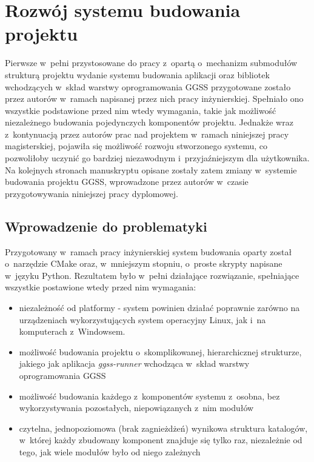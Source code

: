 \clearpage
\section{Rozwój systemu budowania projektu}
\label{ch:building_project}

Pierwsze w~pełni przystosowane do pracy z~opartą o~mechanizm submodułów strukturą projektu wydanie systemu budowania aplikacji oraz bibliotek wchodzących w~skład warstwy oprogramowania GGSS przygotowane zostało przez autorów w~ramach napisanej przez nich pracy inżynierskiej. Spełniało ono wszystkie podstawione przed nim wtedy wymagania, takie jak możliwość niezależnego budowania pojedynczych komponentów projektu. Jednakże wraz z~kontynuacją przez autorów prac nad projektem w~ramach niniejszej pracy magisterskiej, pojawiła się możliwość rozwoju stworzonego systemu, co pozwoliłoby uczynić go bardziej niezawodnym i~przyjaźniejszym dla użytkownika. Na kolejnych stronach manuskryptu opisane zostały zatem zmiany w~systemie budowania projektu GGSS, wprowadzone przez autorów w~czasie przygotowywania niniejszej pracy dyplomowej.

\subsection{Wprowadzenie do problematyki}
Przygotowany w~ramach pracy inżynierskiej system budowania oparty został o~narzędzie CMake oraz, w~mniejszym stopniu, o~proste skrypty napisane w~języku Python. Rezultatem było w~pełni działające rozwiązanie, spełniające wszystkie postawione wtedy przed nim wymagania:
\begin{itemize}
    \item niezależność od platformy - system powinien działać poprawnie zarówno na urządzeniach wykorzystujących system operacyjny Linux, jak i~na komputerach z~Windowsem.
    \item możliwość budowania projektu o~skomplikowanej, hierarchicznej strukturze, jakiego jak aplikacja \emph{ggss-runner} wchodząca w~skład warstwy oprogramowania GGSS 
    \item możliwość budowania każdego z~komponentów systemu z~osobna, bez wykorzystywania pozostałych, niepowiązanych z~nim modułów
    \item czytelna, jednopoziomowa (brak zagnieżdżeń) wynikowa struktura katalogów, w~której każdy zbudowany komponent znajduje się tylko raz, niezależnie od tego, jak wiele modułów było od niego zależnych
\end{itemize}

